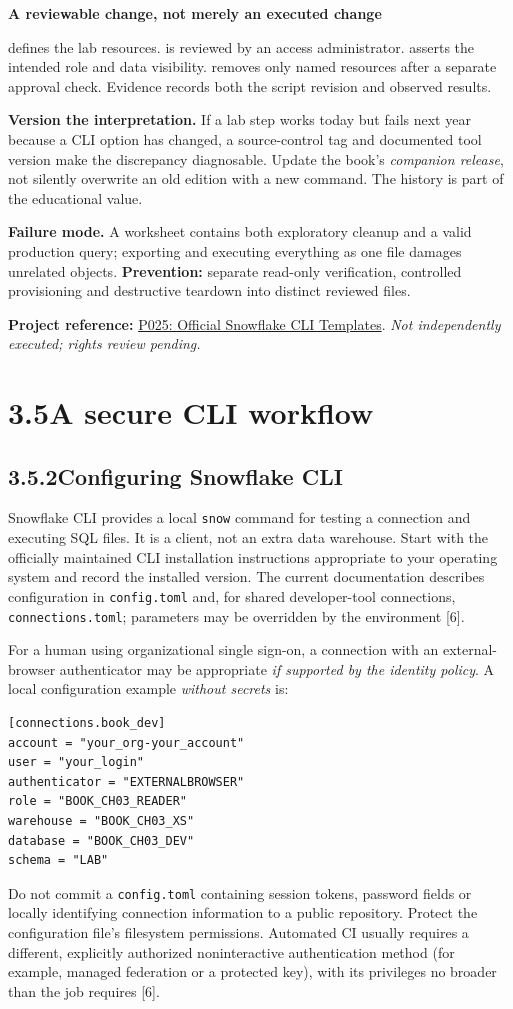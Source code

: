 \documentclass[11pt,twoside]{article}
\newcommand{\topic}[2]{\subsection*{#1\quad #2}}
\newcommand{\repo}[2]{\par\begingroup\fontsize{8.0}{9.6}\selectfont\sffamily\color{inkgray}\textbf{Project reference:} \href{#2}{#1}. \textit{Not independently executed; rights review pending.}\par\endgroup}
\begin{document}
\begin{whitebox}
\textbf{A reviewable change, not merely an executed change}\par
{} defines the lab resources.  is reviewed by an access administrator.  asserts the intended role and data visibility.  removes only named resources after a separate approval check. Evidence records both the script revision and observed results.
\end{whitebox}
\textbf{Version the interpretation.} If a lab step works today but fails next year because a CLI option has changed, a source-control tag and documented tool version make the discrepancy diagnosable. Update the book's \emph{companion release}, not silently overwrite an old edition with a new command. The history is part of the educational value.

\textbf{Failure mode.} A worksheet contains both exploratory cleanup and a valid production query; exporting and executing everything as one file damages unrelated objects. \textbf{Prevention:} separate read-only verification, controlled provisioning and destructive teardown into distinct reviewed files.

\repo{P025: Official Snowflake CLI Templates}{https://github.com/snowflakedb/snowflake-cli-templates}

\newpage
\section*{3.5\quad A secure CLI workflow}
\topic{3.5.2}{Configuring Snowflake CLI}
Snowflake CLI provides a local \texttt{snow} command for testing a connection and executing SQL files. It is a client, not an extra data warehouse. Start with the officially maintained CLI installation instructions appropriate to your operating system and record the installed version. The current documentation describes configuration in \texttt{config.toml} and, for shared developer-tool connections, \texttt{connections.toml}; parameters may be overridden by the environment [6].

For a human using organizational single sign-on, a connection with an external-browser authenticator may be appropriate \emph{if supported by the identity policy}. A local configuration example \emph{without secrets} is:
\begin{lstlisting}[caption={Illustrative CLI config.toml; adapt account and user locally.}]
[connections.book_dev]
account = "your_org-your_account"
user = "your_login"
authenticator = "EXTERNALBROWSER"
role = "BOOK_CH03_READER"
warehouse = "BOOK_CH03_XS"
database = "BOOK_CH03_DEV"
schema = "LAB"
\end{lstlisting}
Do not commit a \texttt{config.toml} containing session tokens, password fields or locally identifying connection information to a public repository. Protect the configuration file's filesystem permissions. Automated CI usually requires a different, explicitly authorized noninteractive authentication method (for example, managed federation or a protected key), with its privileges no broader than the job requires [6].
\end{document}
